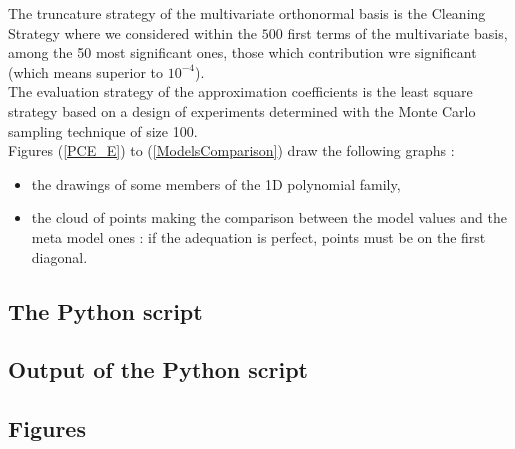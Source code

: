 \documentclass[11pt]{article}
\begin{document}
The truncature strategy of the multivariate orthonormal basis is the Cleaning Strategy where we considered within the $500$ first terms of the multivariate basis, among the 50 most significant ones, those which contribution wre significant (which means superior to $10^{-4}$).\\

The evaluation strategy of the approximation coefficients is the least square strategy based on a design of experiments  determined with the Monte Carlo sampling technique of size 100.\\

Figures (\ref{PCE_E}) to (\ref{ModelsComparison}) draw the following graphs :
\begin{itemize}
\item the drawings of some members of the 1D polynomial family,
\item the cloud of points making the comparison between the model values and the meta model ones : if the adequation is perfect, points must be on the first diagonal.
\end{itemize}















\subsection{The Python script}








\subsection{Output of the Python script}





\subsection{Figures}
\end{document}
